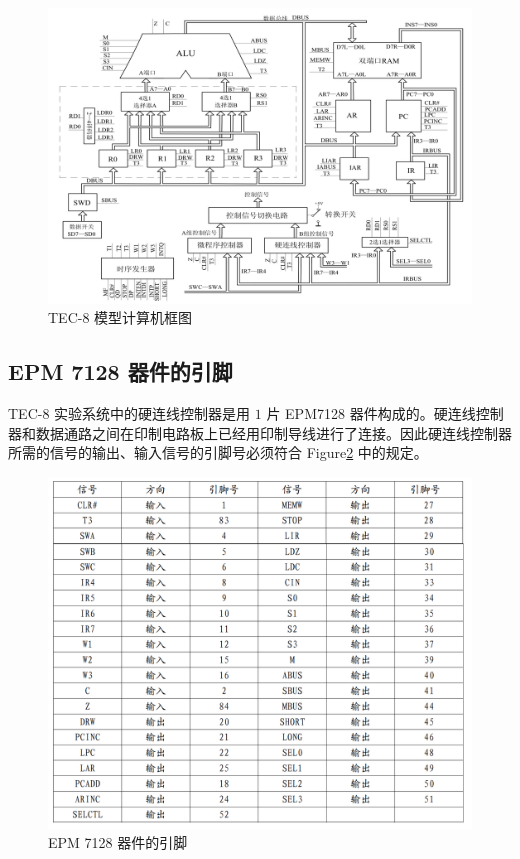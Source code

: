 \documentclass[12pt]{article}
\begin{document}
{        \begin{figure}[!ht]
            \centering
            \includegraphics[width=1.0\textwidth]{数据通路.png}
            \caption{TEC-8 模型计算机框图}
            \label{fig:4-1-2}
        \end{figure}
    
    \subsection{EPM 7128 器件的引脚}
        TEC-8 实验系统中的硬连线控制器是用 $1$ 片 EPM7128 器件构成的。硬连线控制器和数据通路之间在印制电路板上已经用印制导线进行了连接。因此硬连线控制器所需的信号的输出、输入信号的引脚号必须符合 Figure\ref{fig:4-1-3} 中的规定。
        
        \begin{figure}[!ht]
        	\centering
        	\includegraphics[width=1.0\textwidth]{引脚.png}
        	\caption{EPM 7128 器件的引脚}
        	\centering
        	\label{fig:4-1-3}
        \end{figure}
    
}
\end{document}
